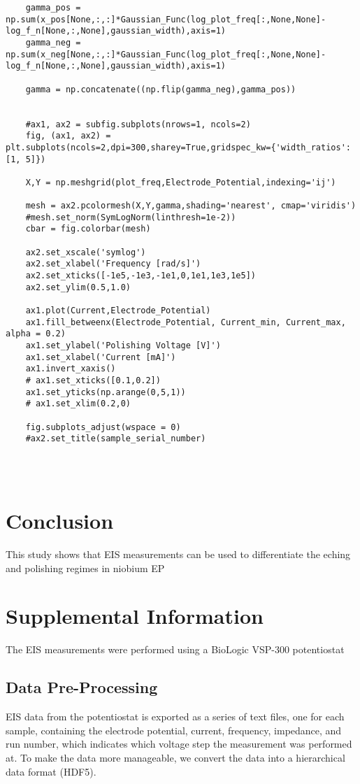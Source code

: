 \documentclass[11pt]{article}
\begin{document}
\begin{verbatim}
    gamma_pos = np.sum(x_pos[None,:,:]*Gaussian_Func(log_plot_freq[:,None,None]-log_f_n[None,:,None],gaussian_width),axis=1)
    gamma_neg = np.sum(x_neg[None,:,:]*Gaussian_Func(log_plot_freq[:,None,None]-log_f_n[None,:,None],gaussian_width),axis=1)

    gamma = np.concatenate((np.flip(gamma_neg),gamma_pos))


    #ax1, ax2 = subfig.subplots(nrows=1, ncols=2)    
    fig, (ax1, ax2) = plt.subplots(ncols=2,dpi=300,sharey=True,gridspec_kw={'width_ratios': [1, 5]})

    X,Y = np.meshgrid(plot_freq,Electrode_Potential,indexing='ij')

    mesh = ax2.pcolormesh(X,Y,gamma,shading='nearest', cmap='viridis')
    #mesh.set_norm(SymLogNorm(linthresh=1e-2))
    cbar = fig.colorbar(mesh)

    ax2.set_xscale('symlog')
    ax2.set_xlabel('Frequency [rad/s]')
    ax2.set_xticks([-1e5,-1e3,-1e1,0,1e1,1e3,1e5])
    ax2.set_ylim(0.5,1.0)

    ax1.plot(Current,Electrode_Potential)
    ax1.fill_betweenx(Electrode_Potential, Current_min, Current_max, alpha = 0.2)
    ax1.set_ylabel('Polishing Voltage [V]')
    ax1.set_xlabel('Current [mA]')
    ax1.invert_xaxis()
    # ax1.set_xticks([0.1,0.2])
    ax1.set_yticks(np.arange(0,5,1))
    # ax1.set_xlim(0.2,0)

    fig.subplots_adjust(wspace = 0)
    #ax2.set_title(sample_serial_number)




\end{verbatim}


\section{Conclusion}
\label{sec:org57282ed}
This study shows that EIS measurements can be used to differentiate the eching and polishing regimes in niobium EP
\section{Supplemental Information}
\label{sec:org60214d3}
The EIS measurements were performed using a BioLogic VSP-300 potentiostat

\subsection{Data Pre-Processing}
\label{sec:org43eac05}
EIS data from the potentiostat is exported as a series of text files, one for each sample, containing the electrode potential, current, frequency, impedance, and run number, which indicates which voltage step the measurement was performed at. To make the data more manageable, we convert the data into a hierarchical data format (HDF5). 
\end{document}

